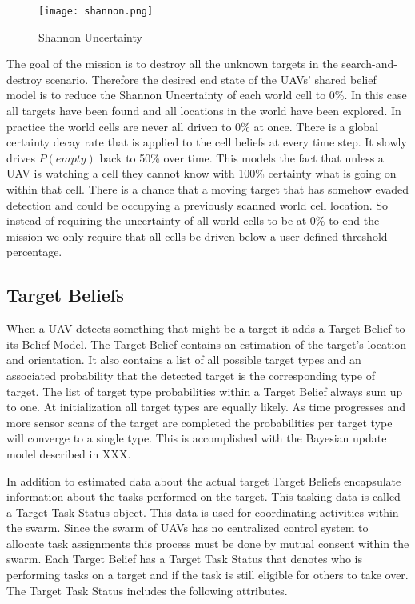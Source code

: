 \begin{figure}[p]
	\centering
	\texttt{[image: shannon.png]}
	\caption{Shannon Uncertainty}
	\label{fig:shannon}
\end{figure}

The goal of the mission is to destroy all the unknown targets in the search-and-destroy scenario.  Therefore the desired end state of the UAVs' shared belief model is to reduce the Shannon Uncertainty of each world cell to 0\%.  In this case all targets have been found and all locations in the world have been explored.  In practice the world cells are never all driven to 0\% at once.  There is a global certainty decay rate that is applied to the cell beliefs at every time step.  It slowly drives $P(empty)$ back to 50\% over time.  This models the fact that unless a UAV is watching a cell they cannot know with 100\% certainty what is going on within that cell.  There is a chance that a moving target that has somehow evaded detection and could be occupying a previously scanned world cell location.  So instead of requiring the uncertainty of all world cells to be at 0\% to end the mission we only require that all cells be driven below a user defined threshold percentage.

\subsection{Target Beliefs}
When a UAV detects something that might be a target it adds a Target Belief to its Belief Model.  The Target Belief contains an estimation of the target's location and orientation.  It also contains a list of all possible target types and an associated probability that the detected target is the corresponding type of target. The list of target type probabilities within a Target Belief always sum up to one.  At initialization all target types are equally likely.  As time progresses and more sensor scans of the target are completed the probabilities per target type will converge to a single type.  This is accomplished with the Bayesian update model described in XXX.  

In addition to estimated data about the actual target Target Beliefs encapsulate information about the tasks performed on the target.  This tasking data is called a Target Task Status object.  This data is used for coordinating activities within the swarm.  Since the swarm of UAVs has no centralized control system to allocate task assignments this process must be done by mutual consent within the swarm.  Each Target Belief has a Target Task Status that denotes who is performing tasks on a target and if the task is still eligible for others to take over.  The Target Task Status includes the following attributes.

